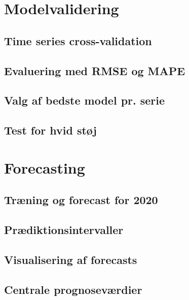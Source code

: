 \documentclass[
]{article}
\begin{document}
\section{Modelvalidering}\label{modelvalidering}

\subsection{Time series
cross-validation}\label{time-series-cross-validation}

\subsection{Evaluering med RMSE og
MAPE}\label{evaluering-med-rmse-og-mape}

\subsection{Valg af bedste model pr.
serie}\label{valg-af-bedste-model-pr.-serie}

\subsection{Test for hvid støj}\label{test-for-hvid-stuxf8j}

\section{Forecasting}\label{forecasting}

\subsection{Træning og forecast for
2020}\label{truxe6ning-og-forecast-for-2020}

\subsection{Prædiktionsintervaller}\label{pruxe6diktionsintervaller}

\subsection{Visualisering af
forecasts}\label{visualisering-af-forecasts}

\subsection{Centrale prognoseværdier}\label{centrale-prognosevuxe6rdier}
\end{document}

